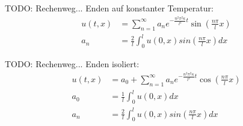 TODO: Rechenweg... Enden auf konstanter Temperatur:
\begin{equation}
\begin{aligned}
    u(t,x)
    &=
    \sum_{n=1}^{\infty}a_{n}e^{-\frac{n^{2}\pi^{2}\kappa}{l^{2}}t}
    \sin\left(\frac{n\pi}{l}x\right)
    \\
    a_{n}
    &=
    \frac{2}{l}\int_{0}^{l}u(0,x)sin\left(\frac{n\pi}{l}x\right) dx
\end{aligned}
\end{equation}

TODO: Rechenweg... Enden isoliert:
\begin{equation}
\begin{aligned}
    u(t,x)
    &=
    a_{0} + \sum_{n=1}^{\infty}a_{n}e^{-\frac{n^{2}\pi^{2}\kappa}{l^{2}}t}
    \cos\left(\frac{n\pi}{l}x\right)
    \\
    a_{0}
    &=
    \frac{1}{l}\int_{0}^{l}u(0,x) dx
    \\
    a_{n}
    &=
    \frac{2}{l}\int_{0}^{l}u(0,x)sin\left(\frac{n\pi}{l}x\right) dx
\end{aligned}
\end{equation}
